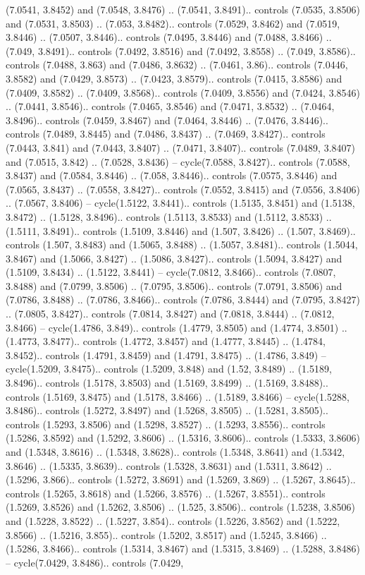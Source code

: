(7.0541, 3.8452) and (7.0548, 3.8476) .. (7.0541, 3.8491).. controls (7.0535, 3.8506) and (7.0531, 3.8503) .. (7.053, 3.8482).. controls (7.0529, 3.8462) and (7.0519, 3.8446) .. (7.0507, 3.8446).. controls (7.0495, 3.8446) and (7.0488, 3.8466) .. (7.049, 3.8491).. controls (7.0492, 3.8516) and (7.0492, 3.8558) .. (7.049, 3.8586).. controls (7.0488, 3.863) and (7.0486, 3.8632) .. (7.0461, 3.86).. controls (7.0446, 3.8582) and (7.0429, 3.8573) .. (7.0423, 3.8579).. controls (7.0415, 3.8586) and (7.0409, 3.8582) .. (7.0409, 3.8568).. controls (7.0409, 3.8556) and (7.0424, 3.8546) .. (7.0441, 3.8546).. controls (7.0465, 3.8546) and (7.0471, 3.8532) .. (7.0464, 3.8496).. controls (7.0459, 3.8467) and (7.0464, 3.8446) .. (7.0476, 3.8446).. controls (7.0489, 3.8445) and (7.0486, 3.8437) .. (7.0469, 3.8427).. controls (7.0443, 3.841) and (7.0443, 3.8407) .. (7.0471, 3.8407).. controls (7.0489, 3.8407) and (7.0515, 3.842) .. (7.0528, 3.8436) -- cycle(7.0588, 3.8427).. controls (7.0588, 3.8437) and (7.0584, 3.8446) .. (7.058, 3.8446).. controls (7.0575, 3.8446) and (7.0565, 3.8437) .. (7.0558, 3.8427).. controls (7.0552, 3.8415) and (7.0556, 3.8406) .. (7.0567, 3.8406) -- cycle(1.5122, 3.8441).. controls (1.5135, 3.8451) and (1.5138, 3.8472) .. (1.5128, 3.8496).. controls (1.5113, 3.8533) and (1.5112, 3.8533) .. (1.5111, 3.8491).. controls (1.5109, 3.8446) and (1.507, 3.8426) .. (1.507, 3.8469).. controls (1.507, 3.8483) and (1.5065, 3.8488) .. (1.5057, 3.8481).. controls (1.5044, 3.8467) and (1.5066, 3.8427) .. (1.5086, 3.8427).. controls (1.5094, 3.8427) and (1.5109, 3.8434) .. (1.5122, 3.8441) -- cycle(7.0812, 3.8466).. controls (7.0807, 3.8488) and (7.0799, 3.8506) .. (7.0795, 3.8506).. controls (7.0791, 3.8506) and (7.0786, 3.8488) .. (7.0786, 3.8466).. controls (7.0786, 3.8444) and (7.0795, 3.8427) .. (7.0805, 3.8427).. controls (7.0814, 3.8427) and (7.0818, 3.8444) .. (7.0812, 3.8466) -- cycle(1.4786, 3.849).. controls (1.4779, 3.8505) and (1.4774, 3.8501) .. (1.4773, 3.8477).. controls (1.4772, 3.8457) and (1.4777, 3.8445) .. (1.4784, 3.8452).. controls (1.4791, 3.8459) and (1.4791, 3.8475) .. (1.4786, 3.849) -- cycle(1.5209, 3.8475).. controls (1.5209, 3.848) and (1.52, 3.8489) .. (1.5189, 3.8496).. controls (1.5178, 3.8503) and (1.5169, 3.8499) .. (1.5169, 3.8488).. controls (1.5169, 3.8475) and (1.5178, 3.8466) .. (1.5189, 3.8466) -- cycle(1.5288, 3.8486).. controls (1.5272, 3.8497) and (1.5268, 3.8505) .. (1.5281, 3.8505).. controls (1.5293, 3.8506) and (1.5298, 3.8527) .. (1.5293, 3.8556).. controls (1.5286, 3.8592) and (1.5292, 3.8606) .. (1.5316, 3.8606).. controls (1.5333, 3.8606) and (1.5348, 3.8616) .. (1.5348, 3.8628).. controls (1.5348, 3.8641) and (1.5342, 3.8646) .. (1.5335, 3.8639).. controls (1.5328, 3.8631) and (1.5311, 3.8642) .. (1.5296, 3.866).. controls (1.5272, 3.8691) and (1.5269, 3.869) .. (1.5267, 3.8645).. controls (1.5265, 3.8618) and (1.5266, 3.8576) .. (1.5267, 3.8551).. controls (1.5269, 3.8526) and (1.5262, 3.8506) .. (1.525, 3.8506).. controls (1.5238, 3.8506) and (1.5228, 3.8522) .. (1.5227, 3.854).. controls (1.5226, 3.8562) and (1.5222, 3.8566) .. (1.5216, 3.855).. controls (1.5202, 3.8517) and (1.5245, 3.8466) .. (1.5286, 3.8466).. controls (1.5314, 3.8467) and (1.5315, 3.8469) .. (1.5288, 3.8486) -- cycle(7.0429, 3.8486).. controls (7.0429, 